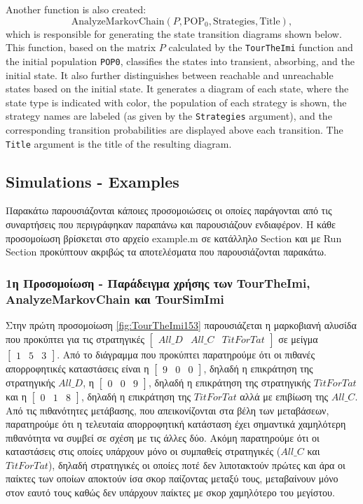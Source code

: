 Another function is also created:
\[
\text{AnalyzeMarkovChain}(P, \text{POP}_0, \text{Strategies}, \text{Title}),
\]
which is responsible for generating the state transition diagrams shown below. This function, based on the matrix \( P \) calculated by the \texttt{TourTheImi} function and the initial population \texttt{POP0}, classifies the states into transient, absorbing, and the initial state. It also further distinguishes between reachable and unreachable states based on the initial state. It generates a diagram of each state, where the state type is indicated with color, the population of each strategy is shown, the strategy names are labeled (as given by the \texttt{Strategies} argument), and the corresponding transition probabilities are displayed above each transition. The \texttt{Title} argument is the title of the resulting diagram.

\subsection{Simulations - Examples}
Παρακάτω παρουσιάζονται κάποιες προσομοιώσεις οι οποίες παράγονται από τις συναρτήσεις που περιγράφηκαν παραπάνω και παρουσιάζουν ενδιαφέρον. Η κάθε προσομοίωση βρίσκεται στο αρχείο example.m σε κατάλληλο Section και με Run Section προκύπτουν ακριβώς τα αποτελέσματα που παρουσιάζονται παρακάτω.
\subsubsection{1η Προσομοίωση - Παράδειγμα χρήσης των Tour\-The\-Imi, Analyze\-Markov\-Chain και Tour\-Sim\-Imi}
Στην πρώτη προσομοίωση \ref{fig:TourTheImi153} παρουσιάζεται η μαρκοβιανή αλυσίδα που προκύπτει για τις στρατηγικές $\begin{bmatrix}All\_D&All\_C&TitForTat\end{bmatrix}$ σε μείγμα $\begin{bmatrix}1&5&3\end{bmatrix}$.
Από το διάγραμμα που προκύπτει παρατηρούμε ότι οι πιθανές απορροφητικές καταστάσεις είναι η $\begin{bmatrix}9&0&0\end{bmatrix}$, δηλαδή η επικράτηση της στρατηγικής $All\_D$, η $\begin{bmatrix}0&0&9\end{bmatrix}$, δηλαδή η επικράτηση της στρατηγικής $TitForTat$ και η $\begin{bmatrix}0&1&8\end{bmatrix}$, δηλαδή η επικράτηση της $TitForTat$ αλλά με επιβίωση της $All\_C$. Από τις πιθανότητες μετάβασης, που απεικονίζονται στα βέλη των μεταβάσεων, παρατηρούμε ότι η τελευταία απορροφητική κατάσταση έχει σημαντικά χαμηλότερη πιθανότητα να συμβεί σε σχέση με τις άλλες δύο. Ακόμη παρατηρούμε ότι οι καταστάσεις στις οποίες υπάρχουν μόνο οι συμπαθείς στρατηγικές ($All\_C$ και $TitForTat$), δηλαδή στρατηγικές οι οποίες ποτέ δεν λιποτακτούν πρώτες και άρα οι παίκτες των οποίων αποκτούν ίσα σκορ παίζοντας μεταξύ τους, μεταβαίνουν μόνο στον εαυτό τους καθώς δεν υπάρχουν παίκτες με σκορ χαμηλότερο του μεγίστου.

